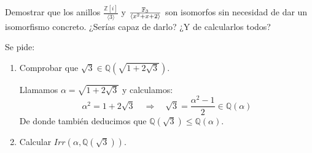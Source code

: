 \begin{ejercicio}
    Demostrar que los anillos $\frac{\mathbb{Z}[i]}{\langle 3 \rangle }$ y $\frac{\mathbb{F}_3}{\langle x^2+x+2 \rangle }$ son isomorfos sin necesidad de dar un isomorfismo concreto. ¿Serías capaz de darlo? ¿Y de calcularlos todos?
\end{ejercicio}

\begin{ejercicio} %
    Se pide:
    \begin{enumerate}
        \item Comprobar que $\sqrt{3}\in \mathbb{Q}\left(\sqrt{1+2\sqrt{3}}\right)$.

            Llamamos $\alpha = \sqrt{1+2\sqrt{3}}$ y calculamos:
            \begin{equation*}
                \alpha^2 = 1+2\sqrt{3} \quad \Longrightarrow \quad  \sqrt{3} = \dfrac{\alpha^{2}-1}{2}\in \mathbb{Q}(\alpha)
            \end{equation*}
            De donde también deducimos que $\mathbb{Q}(\sqrt{3})\leq \mathbb{Q}(\alpha)$.
        \item Calcular $Irr\left(\alpha, \mathbb{Q}\left(\sqrt{3}\right)\right)$.


\end{enumerate}
\end{ejercicio}
